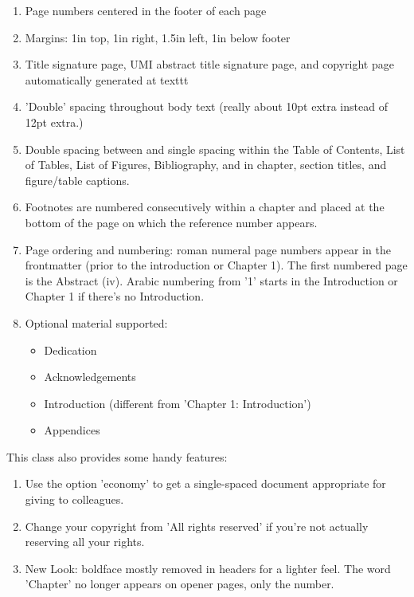 \begin{enumerate}
\def\labelenumi{\arabic{enumi}.}
\item
  Page numbers centered in the footer of each page
\item
  Margins: 1in top, 1in right, 1.5in left, 1in below footer
\item
  Title signature page, UMI abstract title signature page, and copyright
  page automatically generated at texttt
\item
  'Double' spacing throughout body text (really about 10pt extra instead
  of 12pt extra.)
\item
  Double spacing between and single spacing within the Table of
  Contents, List of Tables, List of Figures, Bibliography, and in
  chapter, section titles, and figure/table captions.
\item
  Footnotes are numbered consecutively within a chapter and placed at
  the bottom of the page on which the reference number appears.
\item
  Page ordering and numbering: roman numeral page numbers appear in the
  frontmatter (prior to the introduction or Chapter 1). The first
  numbered page is the Abstract (iv). Arabic numbering from '1' starts
  in the Introduction or Chapter 1 if there's no Introduction.
\item
  Optional material supported:

  \begin{itemize}
  \item
    Dedication
  \item
    Acknowledgements
  \item
    Introduction (different from 'Chapter 1: Introduction')
  \item
    Appendices
  \end{itemize}
\end{enumerate}

This class also provides some handy features:

\begin{enumerate}
\def\labelenumi{\arabic{enumi}.}
\item
  Use the option 'economy' to get a single-spaced document appropriate
  for giving to colleagues.
\item
  Change your copyright from 'All rights reserved' if you're not
  actually reserving all your rights.
\item
  New Look: boldface mostly removed in headers for a lighter feel. The
  word 'Chapter' no longer appears on opener pages, only the number.
\end{enumerate}

